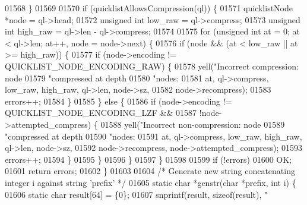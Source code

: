 \begin{DoxyCode}
{{{{{{{{{{{{{{{{{{{{{{{{{{{01568     \}
01569 
01570     \textcolor{keywordflow}{if} (quicklistAllowsCompression(ql)) \{
01571         quicklistNode *node = ql->head;
01572         \textcolor{keywordtype}{unsigned} \textcolor{keywordtype}{int} low\_raw = ql->compress;
01573         \textcolor{keywordtype}{unsigned} \textcolor{keywordtype}{int} high\_raw = ql->len - ql->compress;
01574 
01575         \textcolor{keywordflow}{for} (\textcolor{keywordtype}{unsigned} \textcolor{keywordtype}{int} at = 0; at < ql->len; at++, node = node->next) \{
01576             \textcolor{keywordflow}{if} (node && (at < low\_raw || at >= high\_raw)) \{
01577                 \textcolor{keywordflow}{if} (node->encoding != QUICKLIST\_NODE\_ENCODING\_RAW) \{
01578                     yell(\textcolor{stringliteral}{"Incorrect compression: node %
01579                          \textcolor{stringliteral}{"compressed at depth %
01580                          \textcolor{stringliteral}{"nodes: %
01581                          at, ql->compress, low\_raw, high\_raw, ql->len, node->sz,
01582                          node->recompress);
01583                     errors++;
01584                 \}
01585             \} \textcolor{keywordflow}{else} \{
01586                 \textcolor{keywordflow}{if} (node->encoding != QUICKLIST\_NODE\_ENCODING\_LZF &&
01587                     !node->attempted\_compress) \{
01588                     yell(\textcolor{stringliteral}{"Incorrect non-compression: node %
01589                          \textcolor{stringliteral}{"compressed at depth %
01590                          \textcolor{stringliteral}{"nodes: %
01591                          at, ql->compress, low\_raw, high\_raw, ql->len, node->sz,
01592                          node->recompress, node->attempted\_compress);
01593                     errors++;
01594                 \}
01595             \}
01596         \}
01597     \}
01598 
01599     \textcolor{keywordflow}{if} (!errors)
01600         OK;
01601     \textcolor{keywordflow}{return} errors;
01602 \}
01603 
01604 \textcolor{comment}{/* Generate new string concatenating integer i against string 'prefix' */}
01605 \textcolor{keyword}{static} \textcolor{keywordtype}{char} *genstr(\textcolor{keywordtype}{char} *prefix, \textcolor{keywordtype}{int} i) \{
01606     \textcolor{keyword}{static} \textcolor{keywordtype}{char} result[64] = \{0\};
01607     snprintf(result, \textcolor{keyword}{sizeof}(result), \textcolor{stringliteral}{"%
}}}}}}}}}}}}}}}}}}}}}}}}}}}}}}}}}}
\end{DoxyCode}

